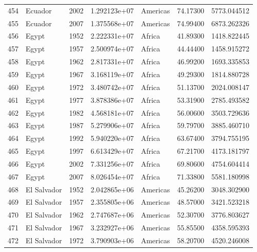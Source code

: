 \documentclass[
  letterpaper,
  DIV=11,
  numbers=noendperiod]{scrreprt}
\begin{document}
\begin{tabular}{llrrlrr}
454  &                   Ecuador &  2002 &  1.292123e+07 &  Americas &  74.17300 &    5773.044512 \\
455  &                   Ecuador &  2007 &  1.375568e+07 &  Americas &  74.99400 &    6873.262326 \\
456  &                     Egypt &  1952 &  2.222331e+07 &    Africa &  41.89300 &    1418.822445 \\
457  &                     Egypt &  1957 &  2.500974e+07 &    Africa &  44.44400 &    1458.915272 \\
458  &                     Egypt &  1962 &  2.817331e+07 &    Africa &  46.99200 &    1693.335853 \\
459  &                     Egypt &  1967 &  3.168119e+07 &    Africa &  49.29300 &    1814.880728 \\
460  &                     Egypt &  1972 &  3.480742e+07 &    Africa &  51.13700 &    2024.008147 \\
461  &                     Egypt &  1977 &  3.878386e+07 &    Africa &  53.31900 &    2785.493582 \\
462  &                     Egypt &  1982 &  4.568181e+07 &    Africa &  56.00600 &    3503.729636 \\
463  &                     Egypt &  1987 &  5.279906e+07 &    Africa &  59.79700 &    3885.460710 \\
464  &                     Egypt &  1992 &  5.940220e+07 &    Africa &  63.67400 &    3794.755195 \\
465  &                     Egypt &  1997 &  6.613429e+07 &    Africa &  67.21700 &    4173.181797 \\
466  &                     Egypt &  2002 &  7.331256e+07 &    Africa &  69.80600 &    4754.604414 \\
467  &                     Egypt &  2007 &  8.026454e+07 &    Africa &  71.33800 &    5581.180998 \\
468  &               El Salvador &  1952 &  2.042865e+06 &  Americas &  45.26200 &    3048.302900 \\
469  &               El Salvador &  1957 &  2.355805e+06 &  Americas &  48.57000 &    3421.523218 \\
470  &               El Salvador &  1962 &  2.747687e+06 &  Americas &  52.30700 &    3776.803627 \\
471  &               El Salvador &  1967 &  3.232927e+06 &  Americas &  55.85500 &    4358.595393 \\
472  &               El Salvador &  1972 &  3.790903e+06 &  Americas &  58.20700 &    4520.246008 \\

\end{tabular}
\end{document}
